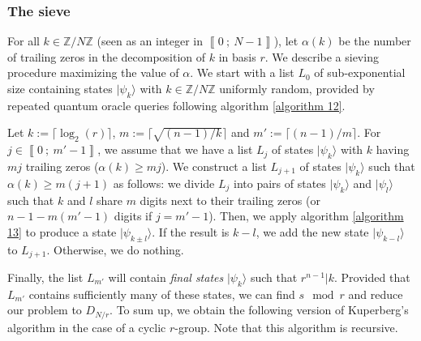 \documentclass[a4paper,10pt]{report}
\theoremstyle{definition}
\theoremstyle{plain}
\theoremstyle{definition}
\newcommand{\Z}{\mathbb{Z}}
\renewcommand{\i}[2]{\left\llbracket #1~;~#2\right\rrbracket}
\renewcommand{\(}{\left(}
\renewcommand{\)}{\right)}
\begin{document}
\subsubsection{The sieve}

For all $k\in\Z/N\Z$ (seen as an integer in $\i{0}{N-1}$), let $\alpha(k)$ be the number of trailing zeros in the decomposition of $k$ in basis $r$. We describe a sieving procedure maximizing the value of $\alpha$. We start with a list $L_0$ of sub-exponential size containing states $|\psi_k\rangle$ with $k\in\Z/N\Z$ uniformly random, provided by repeated quantum oracle queries following algorithm \ref{algorithm 12}.  

Let $k:=\lceil\log_2(r)\rceil$, $m:=\lceil \sqrt{(n-1)/k}\rceil$ and $m':=\lceil (n-1)/m\rceil$. For $j\in\i{0}{m'-1}$, we assume that we have a list $L_j$ of states $|\psi_k\rangle$ with $k$ having $mj$ trailing zeros ($\alpha(k)\geq mj$). We construct a list $L_{j+1}$ of states $|\psi_k\rangle$ such that $\alpha(k)\geq m(j+1)$ as follows: we divide $L_j$ into pairs of states $|\psi_k\rangle$ and $|\psi_l\rangle$ such that $k$ and $l$ share $m$ digits next to their trailing zeros (or $n-1-m(m'-1)$ digits if $j=m'-1$). Then, we apply algorithm \ref{algorithm 13} to produce a state $|\psi_{k\pm l}\rangle$. If the result is $k-l$, we add the new state $|\psi_{k-l}\rangle$ to $L_{j+1}$. Otherwise, we do nothing.  

Finally, the list $L_{m'}$ will contain \emph{final states} $|\psi_k\rangle$ such that $r^{n-1}|k$. Provided that $L_{m'}$ contains sufficiently many of these states, we can find $s \mod r$ and reduce our problem to $D_{N/r}$.  To sum up, we obtain the following version of Kuperberg's algorithm in the case of a cyclic $r$-group. Note that this algorithm is recursive.
\end{document}
